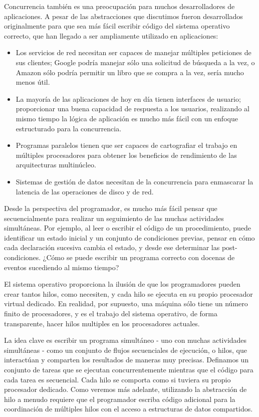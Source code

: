 \documentclass[10pt]{book}
\begin{document}
Concurrencia también es una preocupación para muchos desarrolladores de aplicaciones. A pesar de las abstracciones que discutimos fueron desarrollados originalmente para que sea más fácil escribir código del sistema operativo correcto, que han llegado a ser ampliamente utilizado en aplicaciones:
\begin{itemize}
\item Los servicios de red necesitan ser capaces de manejar múltiples peticiones de sus clientes; Google podría manejar sólo una solicitud de búsqueda a la vez, o Amazon sólo podría permitir un libro que se compra a la vez, sería mucho menos útil.
\item La mayoría de las aplicaciones de hoy en día tienen interfaces de usuario; proporcionar una buena capacidad de respuesta a los usuarios, realizando al mismo tiempo la lógica de aplicación es mucho más fácil con un enfoque estructurado para la concurrencia.
\item Programas paralelos tienen que ser capaces de cartografiar el trabajo en múltiples procesadores para obtener los beneficios de rendimiento de las arquitecturas multinúcleo.
\item Sistemas de gestión de datos necesitan de la concurrencia para enmascarar la latencia de las operaciones de disco y de red.
\end{itemize}

Desde la perspectiva del programador, es mucho más fácil pensar que secuencialmente para realizar un seguimiento de las muchas actividades simultáneas. Por ejemplo, al leer o escribir el código de un procedimiento, puede identificar un estado inicial y un conjunto de condiciones previas, pensar en cómo cada declaración sucesiva cambia el estado, y desde ese determinar las post-condiciones. ¿Cómo se puede escribir un programa correcto con docenas de eventos sucediendo al mismo tiempo? 

El sistema operativo proporciona la ilusión de que los programadores pueden crear tantos hilos, como necesiten, y cada hilo se ejecuta en su propio procesador virtual dedicado. En realidad, por supuesto, una máquina sólo tiene un número finito de procesadores, y es el trabajo del sistema operativo, de forma transparente, hacer hilos multiples en los procesadores actuales.

La idea clave es escribir un programa simultáneo - uno con muchas actividades simultáneas - como un conjunto de flujos secuenciales de ejecución, o hilos, que interactúan y comparten los resultados de maneras muy precisas. Definamos un conjunto de tareas que se ejecutan concurrentemente mientras que el código para cada tarea es secuencial. Cada hilo se comporta como si tuviera su propio procesador dedicado. Como veremos más adelante, utilizando la abstracción de hilo a menudo requiere que el programador escriba código adicional para la coordinación de múltiples hilos con el acceso a estructuras de datos compartidos.
\end{document}
